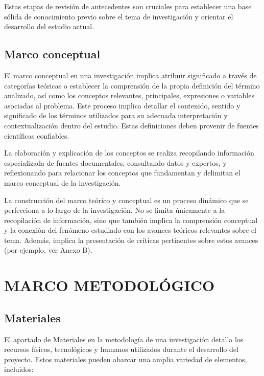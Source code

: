 \documentclass[12pt,a4paper,oneside]{report}
\begin{document}
Estas etapas de revisión de antecedentes son cruciales para establecer una base sólida de conocimiento previo sobre el tema de investigación y orientar el desarrollo del estudio actual.


\section{Marco conceptual}

El marco conceptual en una investigación implica atribuir significado a través de categorías teóricas o establecer la comprensión de la propia definición del término analizado, así como los conceptos relevantes, principales, expresiones o variables asociadas al problema. 
Este proceso implica detallar el contenido, sentido y significado de los términos utilizados para su adecuada interpretación y contextualización dentro del estudio. Estas definiciones deben provenir de fuentes científicas confiables.

La elaboración y explicación de los conceptos se realiza recopilando información especializada de fuentes documentales, consultando datos y expertos, y reflexionando para relacionar los conceptos que fundamentan y delimitan el marco conceptual de la investigación.

La construcción del marco teórico y conceptual es un proceso dinámico que se perfecciona a lo largo de la investigación. 
No se limita únicamente a la recopilación de información, sino que también implica la comprensión conceptual y la conexión del fenómeno estudiado con los avances teóricos relevantes sobre el tema. Además, implica la presentación de críticas pertinentes sobre estos avances (por ejemplo, ver Anexo B).


\chapter{MARCO METODOLÓGICO}

\section{Materiales}

El apartado de Materiales en la metodología de una investigación detalla los recursos físicos, tecnológicos y humanos utilizados durante el desarrollo del proyecto. Estos materiales pueden abarcar una amplia variedad de elementos, incluidos:\\
\end{document}

